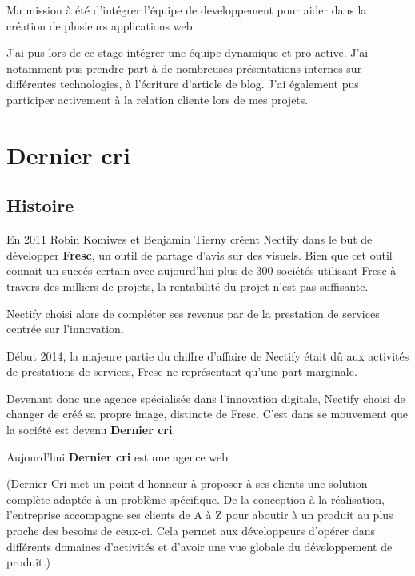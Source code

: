 \bigskip

Ma mission à été d'intégrer l'équipe de developpement pour aider dans la
création de plusieurs applications web.

\bigskip

J'ai pus lors de ce stage intégrer une équipe dynamique et pro-active.
J'ai notamment pus prendre part à de nombreuses présentations internes
sur différentes technologies, à l'écriture d'article de blog. J'ai
également pus participer activement à la relation cliente lors de mes
projets.

\newpage

\section{Dernier cri}\label{dernier-cri}

\bigskip

\subsection{Histoire}\label{histoire}

\bigskip

En 2011 Robin Komiwes et Benjamin Tierny créent Nectify dans le but de
développer \textbf{Fresc}, un outil de partage d'avis sur des visuels.
Bien que cet outil connait un succés certain avec aujourd'hui plus de
300 sociétés utilisant Fresc à travers des milliers de projets, la
rentabilité du projet n'est pas suffisante.

\bigskip

Nectify choisi alors de compléter ses revenus par de la prestation de
services centrée sur l'innovation.

\bigskip

Début 2014, la majeure partie du chiffre d'affaire de Nectify était dû
aux activités de prestations de services, Fresc ne représentant qu'une
part marginale.

\bigskip

Devenant donc une agence spécialisée dans l'innovation digitale, Nectify
choisi de changer de créé sa propre image, distincte de Fresc. C'est
dans se mouvement que la société est devenu \textbf{Dernier cri}.

\bigskip

Aujourd'hui \textbf{Dernier cri} est une agence web

(Dernier Cri met un point d'honneur à proposer à ses clients une
solution complète adaptée à un problème spécifique. De la conception à
la réalisation, l'entreprise accompagne ses clients de A à Z pour
aboutir à un produit au plus proche des besoins de ceux-ci. Cela permet
aux développeurs d'opérer dans différents domaines d'activités et
d'avoir une vue globale du développement de produit.)

